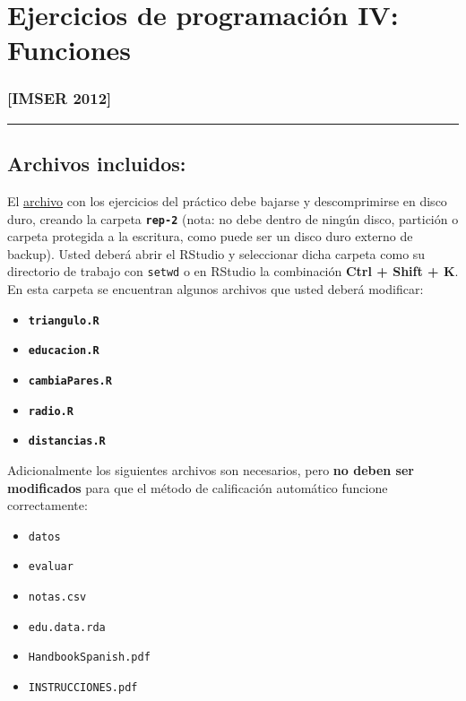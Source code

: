 \documentclass[]{article}
\begin{document}
\section{Ejercicios de programación IV: Funciones}

\subsubsection{{[}IMSER 2012{]}}

\begin{center}\rule{3in}{0.4pt}\end{center}

\subsection{Archivos incluidos:}

El
\href{http://eva.universidad.edu.uy/file.php/1454/ejercicios\_de\_programacion/rep-1.zip}{archivo}
con los ejercicios del práctico debe bajarse y descomprimirse en disco
duro, creando la carpeta \textbf{\texttt{rep-2}} (nota: no debe dentro
de ningún disco, partición o carpeta protegida a la escritura, como
puede ser un disco duro externo de backup). Usted deberá abrir el
RStudio y seleccionar dicha carpeta como su directorio de trabajo con
\texttt{setwd} o en RStudio la combinación \textbf{Ctrl + Shift + K}. En
esta carpeta se encuentran algunos archivos que usted deberá modificar:

\begin{itemize}
\item
  \textbf{\texttt{triangulo.R}}
\item
  \textbf{\texttt{educacion.R}}
\item
  \textbf{\texttt{cambiaPares.R}}
\item
  \textbf{\texttt{radio.R}}
\item
  \textbf{\texttt{distancias.R}}
\end{itemize}
Adicionalmente los siguientes archivos son necesarios, pero \textbf{no
deben ser modificados} para que el método de calificación automático
funcione correctamente:

\begin{itemize}
\item
  \texttt{datos}
\item
  \texttt{evaluar}
\item
  \texttt{notas.csv}
\item
  \texttt{edu.data.rda}
\item
  \texttt{HandbookSpanish.pdf}
\item
  \texttt{INSTRUCCIONES.pdf}
\end{itemize}
\end{document}

